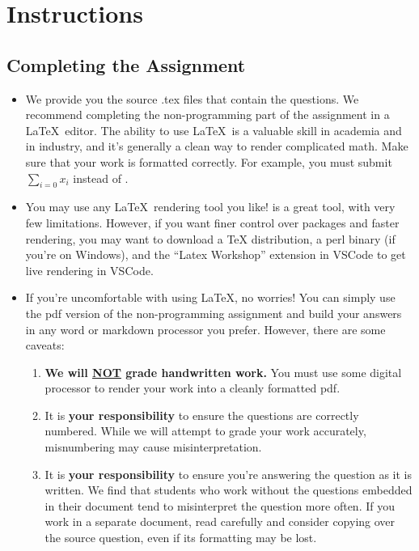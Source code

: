 \section*{Instructions}
\subsection*{Completing the Assignment}
\begin{itemize}
    \item We provide you the source .tex files that contain the questions. We recommend completing the non-programming part of the assignment in a \LaTeX~editor. The ability to use \LaTeX~is a valuable skill in academia and in industry, and it's generally a clean way to render complicated math. Make sure that your work is formatted correctly. For example, you must submit $\sum_{i=0} x_i$ instead of .
    \item You may use any \LaTeX~rendering tool you like!  is a great tool, with very few limitations. However, if you want finer control over packages and faster rendering, you may want to download a TeX distribution, a perl binary (if you're on Windows), and the ``Latex Workshop'' extension in VSCode to get live rendering in VSCode.
    \item If you're uncomfortable with using \LaTeX, no worries! You can simply use the pdf version of the non-programming assignment and build your answers in any word or markdown processor you prefer. However, there are some caveats:\begin{enumerate}[label = \arabic*.]
        \item \textbf{We will \underline{NOT} grade handwritten work.} You must use some digital processor to render your work into a cleanly formatted pdf.
        \item It is \textbf{your responsibility} to ensure the questions are correctly numbered. While we will attempt to grade your work accurately, misnumbering may cause misinterpretation.
        \item It is \textbf{your responsibility} to ensure you're answering the question as it is written. We find that students who work without the questions embedded in their document tend to misinterpret the question more often. If you work in a separate document, read carefully and consider copying over the source question, even if its formatting may be lost.
    \end{enumerate}
\end{itemize}
